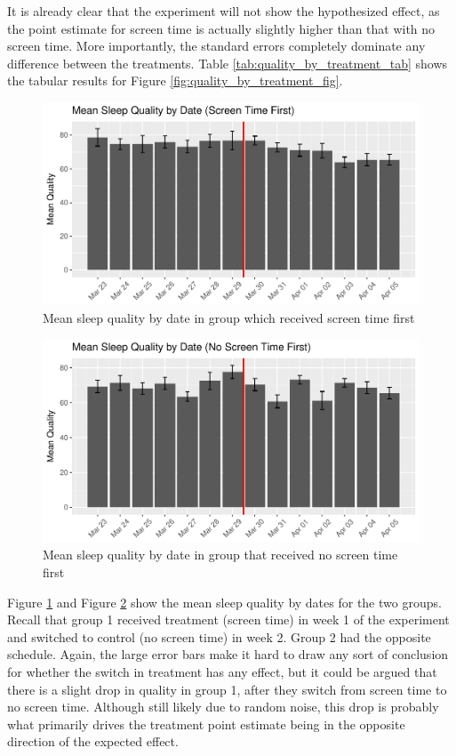 \documentclass[12pt,]{article}
\begin{document}
It is already clear that the experiment will not show the hypothesized
effect, as the point estimate for screen time is actually slightly
higher than that with no screen time. More importantly, the standard
errors completely dominate any difference between the treatments. Table
\ref{tab:quality_by_treatment_tab} shows the tabular results for Figure
\ref{fig:quality_by_treatment_fig}.

\begin{figure}
\centering
\includegraphics{report_files/figure-latex/quality_by_date_group1_fig-1.pdf}
\caption{\label{fig:quality_by_date_group1_fig} Mean sleep quality by
date in group which received screen time first}
\end{figure}

\begin{figure}
\centering
\includegraphics{report_files/figure-latex/quality_by_date_group2_fig-1.pdf}
\caption{\label{fig:quality_by_date_group2_fig} Mean sleep quality by
date in group that received no screen time first}
\end{figure}

Figure \ref{fig:quality_by_date_group1_fig} and Figure
\ref{fig:quality_by_date_group2_fig} show the mean sleep quality by
dates for the two groups. Recall that group 1 received treatment (screen
time) in week 1 of the experiment and switched to control (no screen
time) in week 2. Group 2 had the opposite schedule. Again, the large
error bars make it hard to draw any sort of conclusion for whether the
switch in treatment has any effect, but it could be argued that there is
a slight drop in quality in group 1, after they switch from screen time
to no screen time. Although still likely due to random noise, this drop
is probably what primarily drives the treatment point estimate being in
the opposite direction of the expected effect.
\end{document}
